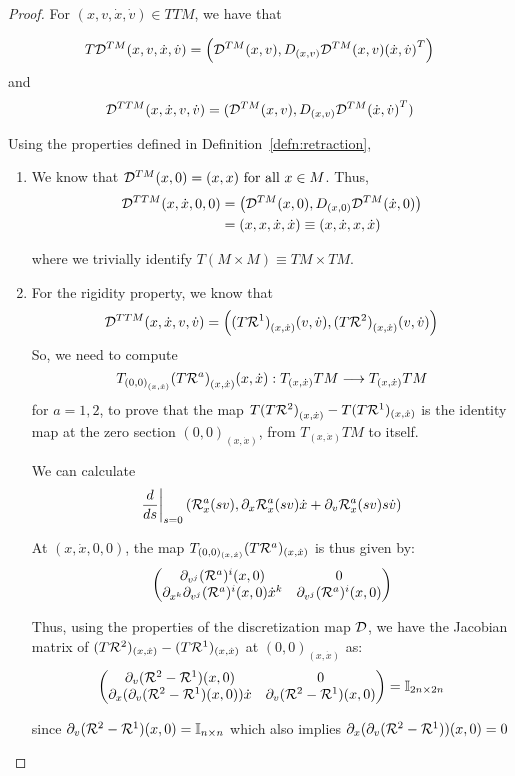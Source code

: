 \begin{proof}
  For $(x,v,\dot{x}, \dot{v}) \in TTM$, we have that 
  
  \[T\mathcal{D}^{TM}(x,v,\dot{x}, \dot{v}) = \left( \mathcal{D}^{TM}(x,v), D_{(x,v)} \mathcal{D}^{TM}(x,v) {(\dot{x}, \dot{v})}^T \right)\] and
  \[
    \mathcal{D}^{TTM}(x, \dot{x}, v, \dot{v}) = (\mathcal{D}^{TM}(x,v), D_{(x,v)}\mathcal{D}^{TM}{(\dot{x}, \dot{v})}^T) 
  \]

  Using the properties defined in Definition~\eqref{defn:retraction},  
  \begin{enumerate}
      \item We know that $\D^{TM}(x, 0) = (x,x) \ \forall x \in M$. Thus,
      \begin{equation*}
      \begin{split}
          \mathcal{D}^{TTM}(x,\dot{x}, 0, 0) & = \left( \mathcal{D}^{TM}(x, 0), D_{(x,0)} \mathcal{D}^{TM}(\dot{x}, 0) \right) \\
          & = (x,x, \dot{x}, \dot{x}) \equiv (x, \dot{x}, x, \dot{x})
      \end{split}
      \end{equation*}
       
      where we trivially identify $T(M \times M) \equiv TM \times TM$.
      \item For the rigidity property, we know that
      \[\mathcal{D}^{TTM}(x, \dot{x}, v, \dot{v}) = \left({(T\mathcal{R}^1)}_{(x,\dot{x})}(v, \dot{v}), {(T\mathcal{R}^2)}_{(x,\dot{x})}(v, \dot{v}) \right)\]
      So, we need to compute 
      \[T_{{(0,0)}_{(x,\dot{x})}}{(T\mathcal{R}^a)}_{(x, \dot{x})}(x, \dot{x}) : T_{(x, \dot{x})}TM \longrightarrow T_{(x, \dot{x})}TM\]
      for $a=1,2$, to prove that the map ${T(T\mathcal{R}^2)}_{(x,\dot{x})} - T(T\mathcal{R}^1)_{(x, \dot{x})}$ is the identity map at the zero section $(0,0)_{(x,\dot{x})}$, from $T_{(x, \dot{x})} TM$ to itself.

      We can calculate 
          \[\dfrac{d}{ds}\bigg|_{s=0} \left( \mathcal{R}^a_x( sv), \partial_{x} \mathcal{R}^a_x(sv) \dot{x} + \partial_v \mathcal{R}^a_x(sv) s \dot{v} \right)\]
      
      At $(x, \dot{x}, 0, 0)$, the map $T_{(0,0)_{(x, \dot{x})}}(T\mathcal{R}^a)_{(x, \dot{x})}$ is thus given by:
      \[\begin{pmatrix}
      \partial_{v^j}(\mathcal{R}^a)^i(x, 0) & 0 \\
      \partial_{x^k} \partial_{v^j} (\mathcal{R}^a)^i(x,0) \dot{x}^k & \partial_{v^j}(\mathcal{R}^a)^i(x,0)
      \end{pmatrix}\]
      
      \vspace{-1mm}
      Thus, using the properties of the discretization map $\mathcal{D}$, we have the Jacobian matrix of $(T\mathcal{R}^2)_{(x, \dot{x})} - (T\mathcal{R}^1)_{(x, \dot{x})}$ at $(0,0)_{(x, \dot{x})}$ as:
      \[\begin{pmatrix}
      \partial_{v}(\mathcal{R}^2-\mathcal{R}^1)(x,0) & 0 \\
      \partial_x(\partial_v(\mathcal{R}^2 - \mathcal{R}^1)(x,0))\dot{x} & \partial_v (\mathcal{R}^2-\mathcal{R}^1)(x,0)
      \end{pmatrix} = \mathbb{I}_{2n \times 2n}
      \]

      \vspace{-1mm}
      since $\partial_v (\mathcal{R}^2-\mathcal{R}^1)(x,0) = \mathbb{I}_{n \times n}$ which also implies $\partial_x(\partial_v(\mathcal{R}^2 - \mathcal{R}^1))(x,0) = 0$
  \end{enumerate}
\end{proof}

